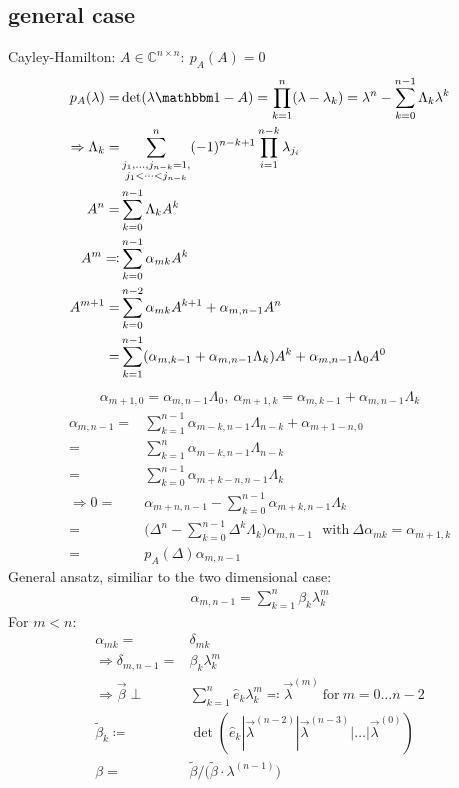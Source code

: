 \documentclass{article}
\begin{document}
\subsection{general case}
Cayley-Hamilton: $A \in \mathbb C^{n\times n}:\ p_A(A) = 0$
\begin{align}
p_A(\lambda) =& \det(\lambda\mathbbm 1 - A) = \prod_{k=1}^n(\lambda - \lambda_k) = \lambda^n - \sum_{k=0}^{n-1} \Lambda_k \lambda^k\nonumber\\
\Rightarrow \Lambda_k =& \sum_{\substack{j_1,\dots,j_{n-k} = 1,\\ j_1<\dots<j_{n-k}}}^n (-1)^{n-k+1} \prod_{i=1}^{n-k} \lambda_{j_i} \\
A^n =& \sum_{k=0}^{n-1} \Lambda_k A^k\nonumber\\
A^m \eqqcolon& \sum_{k=0}^{n-1} \alpha_{mk} A^k\\
A^{m+1} =& \sum_{k=0}^{n-2} \alpha_{mk} A^{k+1} + \alpha_{m,n-1} A^n \nonumber\\
=& \sum_{k=1}^{n-1} (\alpha_{m,k-1} + \alpha_{m,n-1}\Lambda_k) A^k + \alpha_{m,n-1}\Lambda_0 A^0 \nonumber\\
\end{align}
\begin{align}
\alpha_{m+1,0} = \alpha_{m,n-1} \Lambda_0,\ \alpha_{m+1,k} = \alpha_{m,k-1} + \alpha_{m,n-1}\Lambda_k \label{recurrent ndim}
\end{align}
\begin{align}
\alpha_{m,n-1} =& \sum_{k=1}^{n-1} \alpha_{m-k,n-1}\Lambda_{n-k} + \alpha_{m+1-n,0} \nonumber\\
=& \sum_{k=1}^n \alpha_{m-k,n-1}\Lambda_{n-k} \nonumber\\
=& \sum_{k=0}^{n-1} \alpha_{m+k-n,n-1}\Lambda_k\\
\Rightarrow 0=& \alpha_{m+n,n-1} - \sum_{k=0}^{n-1} \alpha_{m+k,n-1}\Lambda_k \nonumber\\
=& \big( \Delta^n - \sum_{k=0}^{n-1} \Delta^k \Lambda_k \big) \alpha_{m, n-1} \ \ \ \text{with}\ \Delta \alpha_{mk} = \alpha_{m+1,k}\nonumber\\
=& p_A(\Delta) \alpha_{m, n-1}
\end{align}
General ansatz, similiar to the two dimensional case:
\begin{align}
\alpha_{m,n-1} = \sum_{k=1}^n \beta_k \lambda_k^m
\end{align}
For $m<n$:
\begin{align}
\alpha_{mk} =& \delta_{mk}\\
\Rightarrow \delta_{m,n-1} =& \beta_k \lambda_k^m\\
\Rightarrow \vec \beta \perp& \sum_{k=1}^n \hat e_k \lambda_k^m \eqqcolon \vec \lambda^{(m)} \ \text{for}\ m=0\dots n-2\\
\tilde\beta_k \coloneqq& \det(\hat e_k | \vec\lambda^{(n-2)} | \vec\lambda^{(n-3)} | \dots | \vec\lambda^{(0)})\nonumber\\
\beta =& \tilde\beta /\big( \tilde \beta \cdot \lambda^{(n-1)} \big)
\end{align}
\end{document}

